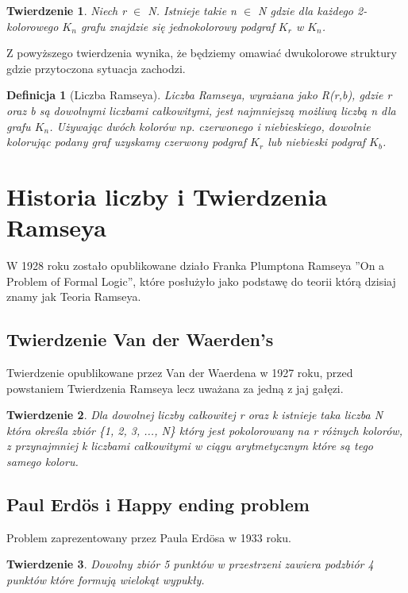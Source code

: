 \documentclass[11pt]{article}
\newtheorem{theorem}{Twierdzenie}
\newtheorem{definition}{Definicja}[section]
\begin{document}
\begin{theorem}
Niech r $\in$ N. Istnieje takie n $\in$ N gdzie dla każdego 2-kolorowego $\mathit{K}_{n}$ grafu znajdzie się jednokolorowy podgraf $\mathit{K}_{r}$ w $\mathit{K}_{n}$.
\end{theorem}

Z powyższego twierdzenia wynika, że będziemy omawiać dwukolorowe struktury gdzie przytoczona sytuacja zachodzi. 

\begin{definition}[Liczba Ramseya]
Liczba Ramseya, wyrażana jako R(r,b), gdzie r oraz b są dowolnymi liczbami całkowitymi, jest najmniejszą możliwą liczbą n dla grafu $\mathit{K}_{n}$. Używając dwóch kolorów np. czerwonego i niebieskiego, dowolnie kolorując podany graf uzyskamy czerwony podgraf $\mathit{K}_{r}$ lub niebieski podgraf $\mathit{K}_{b}$.
\end{definition}

\section{Historia liczby i Twierdzenia Ramseya}

W 1928 roku zostało opublikowane działo Franka Plumptona Ramseya ''On a Problem of Formal Logic'', które posłużyło jako podstawę do teorii którą dzisiaj znamy jak Teoria Ramseya. 


\subsection{Twierdzenie Van der Waerden's}
Twierdzenie opublikowane przez Van der Waerdena w 1927 roku, przed powstaniem Twierdzenia Ramseya lecz uważana za jedną z jaj gałęzi. 

\begin{theorem}
Dla dowolnej liczby całkowitej r oraz k istnieje taka liczba N która określa zbiór \{1, 2, 3, ..., N\} który jest pokolorowany na r różnych kolorów, z przynajmniej k liczbami całkowitymi w ciągu arytmetycznym które są tego samego koloru.
\end{theorem}

\subsection{Paul Erd\"os i Happy ending problem}

Problem zaprezentowany przez Paula Erd\"osa w 1933 roku.

\begin{theorem}
Dowolny zbiór 5 punktów w przestrzeni zawiera podzbiór 4 punktów które formują wielokąt wypukły.
\end{theorem}
\end{document}
